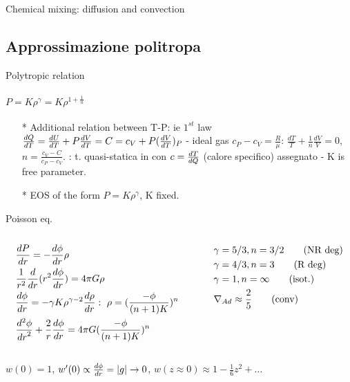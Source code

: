 \begin{frame}{Chemical mixing: diffusion and convection}

\end{frame}

\subsection{Approssimazione politropa}

\begin{frame}{Polytropic relation}
    \framesubtitle{$P=K\rho^{\gamma}=K\rho^{1+\frac{1}{n}}$}
    \begin{itemize}
\item[*] Additional relation between T-P: ie $1^{st}$ law $\TDy{T}{Q}=\TDy{T}{U}+P\TDy{T}{V}=C=c_V+P(\TDy{T}{V})_P$ - ideal gas $c_P-c_V=\frac{R}{\mu}$: $\frac{dT}{T}+\frac{1}{n}\frac{dV}{V}=0$, $n=\frac{c_V-C}{c_P-c_V}$. : t. quasi-statica in  con $c=\TDy{Q}{T}$ (calore specifico) assegnato - K is free parameter.
\item [*] EOS of the form $P=K\rho^{\gamma}$, K fixed.
    \end{itemize}
	\begin{block}{Poisson eq.}
		\begin{columns}[T]
			\begin{column}{0.6\textwidth}
				\begin{align*}
				&\TDy{r}{P}=-\TDy{r}{\phi}\rho\\
				&\frac{1}{r^2}\TDof{r}(r^2\TDy{r}{\phi})=4\pi G\rho\\
				&\TDy{r}{\phi}=-\gamma K\rho\expy{\gamma-2}\TDy{r}{\rho}:\ \rho=(\frac{-\phi}{(n+1)K})^n\\
				&\TtwoDy{r}{\phi}+\frac{2}{r}\TDy{r}{\phi}=4\pi G(\frac{-\phi}{(n+1)K})^n
				\end{align*}
			\end{column}
			\begin{column}{0.4\textwidth}
				\begin{align*}
				&\gamma=5/3, n=3/2\tag{NR deg}\\
				&\gamma=4/3, n=3\tag{R deg}\\
				&\gamma=1, n=\infty\tag{isot.}\\
				&\nad\approx\frac{2}{5}\tag{conv}
				\end{align*}
		\end{column}\end{columns}
	\end{block}
$w(0)=1$, $w'(0)\propto\TDy{r}{\phi}=|g|\to0$, $w(z\approx0)\approx1-\frac{1}{6}z^2+\ldots$
\end{frame}

